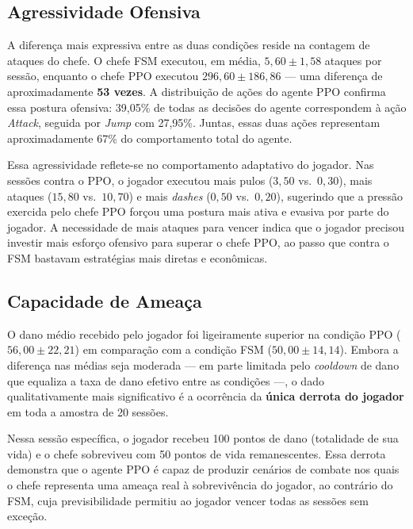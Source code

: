 \subsection{Agressividade Ofensiva}
\label{subsec:agressividade}

A diferença mais expressiva entre as duas condições reside na contagem de
ataques do chefe. O chefe FSM executou, em média, $5{,}60 \pm 1{,}58$ ataques
por sessão, enquanto o chefe PPO executou $296{,}60 \pm 186{,}86$ --- uma
diferença de aproximadamente \textbf{53 vezes}. A distribuição de ações do
agente PPO confirma essa postura ofensiva: 39,05\% de todas as decisões do
agente correspondem à ação \textit{Attack}, seguida por \textit{Jump} com
27,95\%. Juntas, essas duas ações representam aproximadamente 67\% do
comportamento total do agente.

Essa agressividade reflete-se no comportamento adaptativo do jogador. Nas
sessões contra o PPO, o jogador executou mais pulos ($3{,}50$ vs.\ $0{,}30$),
mais ataques ($15{,}80$ vs.\ $10{,}70$) e mais \textit{dashes} ($0{,}50$ vs.\
$0{,}20$), sugerindo que a pressão exercida pelo chefe PPO forçou uma postura
mais ativa e evasiva por parte do jogador. A necessidade de mais ataques para
vencer indica que o jogador precisou investir mais esforço ofensivo para
superar o chefe PPO, ao passo que contra o FSM bastavam estratégias mais
diretas e econômicas.

\subsection{Capacidade de Ameaça}
\label{subsec:capacidade-ameaca}

O dano médio recebido pelo jogador foi ligeiramente superior na condição PPO
($56{,}00 \pm 22{,}21$) em comparação com a condição FSM ($50{,}00 \pm
14{,}14$). Embora a diferença nas médias seja moderada --- em parte limitada
pelo \textit{cooldown} de dano que equaliza a taxa de dano efetivo entre as
condições ---, o dado qualitativamente mais significativo é a ocorrência da
\textbf{única derrota do jogador} em toda a amostra de 20 sessões.

Nessa sessão específica, o jogador recebeu 100 pontos de dano (totalidade de
sua vida) e o chefe sobreviveu com 50 pontos de vida remanescentes. Essa
derrota demonstra que o agente PPO é capaz de produzir cenários de combate nos
quais o chefe representa uma ameaça real à sobrevivência do jogador, ao
contrário do FSM, cuja previsibilidade permitiu ao jogador vencer todas as
sessões sem exceção.

